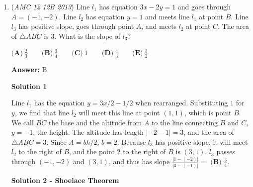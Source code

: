 \begin{enumerate}
 



\textbf{Solution 5}

Consider the quadratic $(1,1), (2,2), (3,4), (4,7), \dots$. Then the finite difference is 1, hence $2a =1$ and thus $a = \frac{1}{2}$. Rewrite the quadratic of the form $\frac{1}{2} x^2 + bx+c$. Then, plugging in 1,2, we have $\frac{1}{2} + b+c = 1$ and $2 + 2b + c = 2$, hence $b+c = \frac{1}{2}$ and $2b+c = 0$, hence $b-2b = \frac{1}{2}$ and thus $b = \frac{-1}{2}$. The quadratic is then $\frac{x(x-1)}{2} + 1$.

 Indeed, this quadratic grants the next time "1" is said by either player. Hence, at $x = 7$, it is said at position 22. We can use this to easily solve the problem, as in $x=10$, it is said as the 46-th position. At $x=11$, it is said at the 56-th position, hence this "chunk" ranges from $1-10$, and the 53rd number is $10_{(55 - 2)} = \boxed{8}_{(53)}$.

 


	\item (\textit{AMC 12 12B 2013}) Line $l_1$ has equation $3x - 2y = 1$ and goes through $A = (-1, -2)$. Line $l_2$ has equation $y = 1$ and meets line $l_1$ at point $B$. Line $l_3$ has positive slope, goes through point $A$, and meets $l_2$ at point $C$. The area of $\triangle ABC$ is $3$. What is the slope of $l_3$?


 $\textbf{(A)}\ \frac{2}{3} \qquad \textbf{(B)}\ \frac{3}{4} \qquad \textbf{(C)}\ 1 \qquad \textbf{(D)}\ \frac{4}{3} \qquad \textbf{(E)}\ \frac{3}{2}$

 \textbf{Answer: }B



\textbf{Solution 1}

Line $l_1$ has the equation $y=3x/2-1/2$ when rearranged. Substituting $1$ for $y$, we find that line $l_2$ will meet this line at point $(1,1)$, which is point $B$. We call $\overline{BC}$ the base and the altitude from $A$ to the line connecting $B$ and $C$, $y=-1$, the height. The altitude has length $|-2-1|=3$, and the area of $\triangle{ABC}=3$. Since $A={bh}/2$, $b=2$. Because $l_3$ has positive slope, it will meet $l_2$ to the right of $B$, and the point $2$ to the right of $B$ is $(3,1)$. $l_3$ passes through $(-1,-2)$ and $(3,1)$, and thus has slope $\frac{|1-(-2)|}{|3-(-1)|}=$ $\boxed{\textbf{(B) }\frac{3}{4}}$.

 



\textbf{Solution 2 - Shoelace Theorem}


\end{enumerate}
